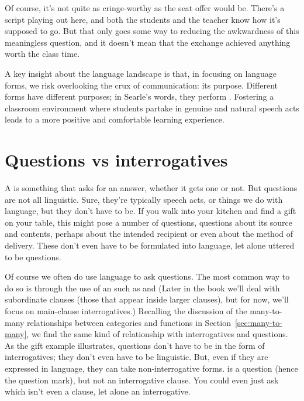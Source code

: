 Of course, it's not quite as cringe-worthy as the seat offer would be. There's a script playing out here, and both the students and the teacher know how it's supposed to go. But that only goes some way to reducing the awkwardness of this meaningless question, and it doesn't mean that the exchange achieved anything worth the class time.

A key insight about the language landscape is that, in focusing on language forms, we risk overlooking the crux of communication: its purpose. Different forms have different purposes; in Searle's words, they perform . Fostering a classroom environment where students partake in genuine and natural speech acts leads to a more positive and comfortable learning experience.

\section{Questions vs interrogatives}

A  is something that asks for an answer, whether it gets one or not. But questions are not all linguistic. Sure, they're typically speech acts, or things we do with language, but they don't have to be. If you walk into your kitchen and find a gift on your table, this might pose a number of questions, questions about its source and contents, perhaps about the intended recipient or even about the method of delivery. These don't even have to be formulated into language, let alone uttered to be questions.

Of course we often do use language to ask questions. The most common way to do so is through the use of an  such as  and  (Later in the book we'll deal with subordinate clauses (those that appear inside larger clauses), but for now, we'll focus on main-clause interrogatives.) Recalling the discussion of the many-to-many relationships between categories and functions in Section~\ref{sec:many-to-many}, we find the same kind of relationship with interrogatives and questions. As the gift example illustrates, questions don't have to be in the form of interrogatives; they don't even have to be linguistic. But, even if they are expressed in language, they can take non-interrogative forms.  is a question (hence the question mark), but not an interrogative clause. You could even just ask  which isn't even a clause, let alone an interrogative.

